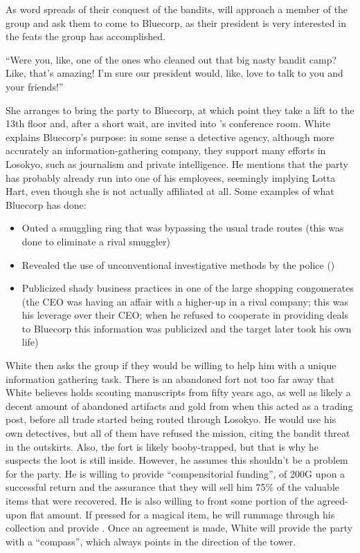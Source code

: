  As word spreads of their conquest of the bandits,  will approach a member of the group and ask them to come to Bluecorp, as their president is very interested in the feats the group has accomplished.\\
\begin{center}
``Were you, like, one of the ones who cleaned out that big nasty bandit camp? Like, that's amazing! I'm sure our president would, like, love to talk to you and your friends!''
\end{center}
She arranges to bring the party to Bluecorp, at which point they take a lift to the 13th floor and, after a short wait, are invited into 's conference room. White explains Bluecorp's purpose: in some sense a detective agency, although more accurately an information-gathering company, they support many efforts in Losokyo, such as journalism and private intelligence. He mentions that the party has probably already run into one of his employees, seemingly implying Lotta Hart, even though she is not actually affiliated at all. Some examples of what Bluecorp has done:
\begin{itemize}
\item Outed a smuggling ring that was bypassing the usual trade routes (this was done to eliminate a rival smuggler)
\item Revealed the use of unconventional investigative methods by the police ()
\item Publicized shady business practices in one of the large shopping congomerates (the CEO was having an affair with a higher-up in a rival company; this was his leverage over their CEO; when he refused to cooperate in providing deals to Bluecorp this information was publicized and the target later took his own life)
\end{itemize}
White then asks the group if they would be willing to help him with a unique information gathering task. There is an abandoned fort not too far away that White believes holds scouting manuscripts from fifty years ago, as well as likely a decent amount of abandoned artifacts and gold from when this acted as a trading post, before all trade started being routed through Losokyo. He would use his own detectives, but all of them have refused the mission, citing the bandit threat in the outskirts. Also, the fort is likely booby-trapped, but that is why he suspects the loot is still inside. However, he assumes this shouldn't be a problem for the party. He is willing to provide ``compensitorial funding'', of 200G upon a successful return and the assurance that they will sell him 75\% of the valuable items that were recovered. He is also willing to front some portion of the agreed-upon flat amount. If pressed for a magical item, he will rummage through his collection and provide . Once an agreement is made, White will provide the party with a ``compass'', which always points in the direction of the tower. \\
